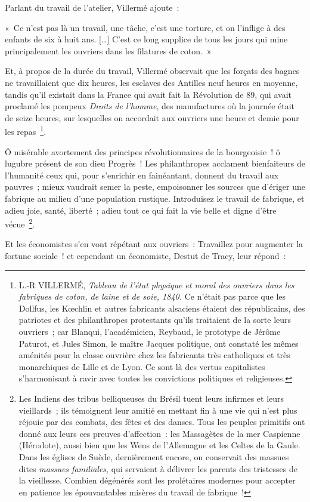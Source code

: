 \documentclass[french,twoside]{book} %
\newenvironment{quoteblock}%
  {\begin{quoting}}
  {\end{quoting}}
\newenvironment{quotebar}{%
    \def\FrameCommand{{\color{rubric!10!}\vrule width 0.5em} \hspace{0.9em}}%
    \def\OuterFrameSep{\itemsep} %
    \MakeFramed {\advance\hsize-\width \FrameRestore}
  }%
  {%
    \endMakeFramed
  }
\renewenvironment{quoteblock}%
  {%
    \savenotes
    \setstretch{0.9}
    \normalfont
    \begin{quotebar}
  }
  {%
    \end{quotebar}
    \spewnotes
  }
\begin{document}
\noindent Parlant du travail de l’atelier, Villermé ajoute :\par

\begin{quoteblock}
 \noindent « Ce n’est pas là un travail, une tâche, c’est une torture, et on l’inflige à des enfants de six à huit ans. […] C’est ce long supplice de tous les jours qui mine principalement les ouvriers dans les filatures de coton. »
\end{quoteblock}

\noindent Et, à propos de la durée du travail, Villermé observait que les forçats des bagnes ne travaillaient que dix heures, les esclaves des Antilles neuf heures en moyenne, tandis qu’il existait dans la France qui avait fait la Révolution de 89, qui avait proclamé les pompeux \emph{Droits de l’homme}, des manufactures où la journée était de seize heures, sur lesquelles on accordait aux ouvriers une heure et demie pour les repas \footnote{L.-R VILLERMÉ, \emph{Tableau de l’état physique et moral des ouvriers dans les fabriques de coton, de laine et de soie, 1840.} Ce n’était pas parce que les Dollfus, les Kœchlin et autres fabricants alsaciens étaient des républicains, des patriotes et des philanthropes protestants qu’ils traitaient de la sorte leurs ouvriers ; car Blanqui, l’académicien, Reybaud, le prototype de Jérôme Paturot, et Jules Simon, le maître Jacques politique, ont constaté les mêmes aménités pour la classe ouvrière chez les fabricants très catholiques et très monarchiques de Lille et de Lyon. Ce sont là des vertus capitalistes s’harmonisant à ravir avec toutes les convictions politiques et religieuses.}.\par
Ô misérable avortement des principes révolutionnaires de la bourgeoisie ! ô lugubre présent de son dieu Progrès ! Les philanthropes acclament bienfaiteurs de l’humanité ceux qui, pour s’enrichir en fainéantant, donnent du travail aux pauvres ; mieux vaudrait semer la peste, empoisonner les sources que d’ériger une fabrique au milieu d’une population rustique. Introduisez le travail de fabrique, et adieu joie, santé, liberté ; adieu tout ce qui fait la vie belle et digne d’être vécue \footnote{Les Indiens des tribus belliqueuses du Brésil tuent leurs infirmes et leurs vieillards ; ils témoignent leur amitié en mettant fin à une vie qui n’est plus réjouie par des combats, des fêtes et des danses. Tous les peuples primitifs ont donné aux leurs ces preuves d’affection : les Massagètes de la mer Caspienne (Hérodote), aussi bien que les Wens de l’Allemagne et les Celtes de la Gaule. Dans les églises de Suède, dernièrement encore, on conservait des massues dites \emph{massues familiales}, qui servaient à délivrer les parents des tristesses de la vieillesse. Combien dégénérés sont les prolétaires modernes pour accepter en patience les épouvantables misères du travail de fabrique !}.\par
Et les économistes s’en vont répétant aux ouvriers : Travaillez pour augmenter la fortune sociale ! et cependant un économiste, Destut de Tracy, leur répond :\par
\end{document}

